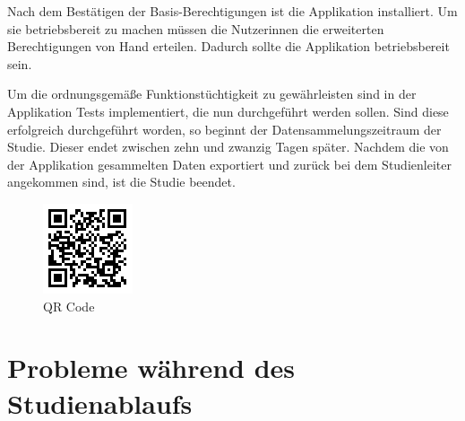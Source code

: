 Nach dem Bestätigen der Basis-Berechtigungen ist die Applikation installiert.
Um sie betriebsbereit zu machen müssen die Nutzerinnen die erweiterten Berechtigungen von Hand erteilen.
Dadurch sollte die Applikation betriebsbereit sein.
\par
Um die ordnungsgemäße Funktionstüchtigkeit zu gewährleisten sind in der Applikation Tests implementiert, die nun durchgeführt werden sollen.
Sind diese erfolgreich durchgeführt worden, so beginnt der Datensammelungszeitraum der Studie.
Dieser endet zwischen zehn und zwanzig Tagen später.
Nachdem die von der Applikation gesammelten Daten exportiert und zurück bei dem Studienleiter angekommen sind, 
ist die Studie beendet.

\begin{figure}[h]
    \centering
    \includegraphics{images/qrcode.png}
    \caption{QR Code}
    \label{fig:qrcode}
\end{figure}


\section{Probleme während des Studienablaufs}

